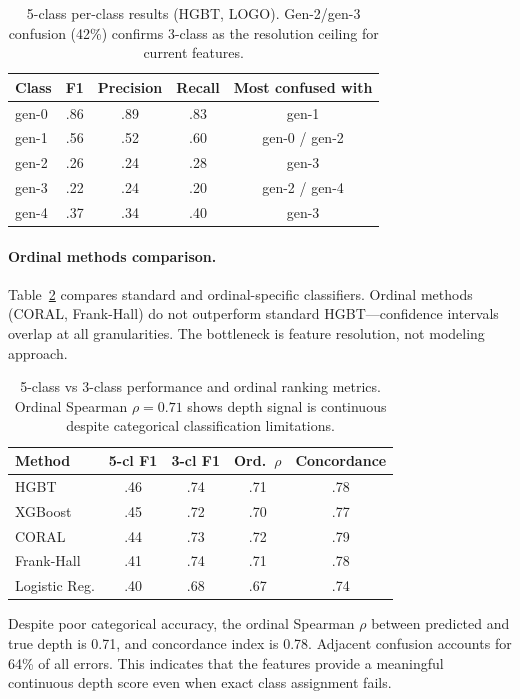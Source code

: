 \documentclass[11pt,a4paper]{article}
\begin{document}
\begin{table}[t]
\centering
\small
\begin{tabular}{lcccc}
\toprule
Class & F1 & Precision & Recall & Most confused with \\
\midrule
gen-0 & .86 & .89 & .83 & gen-1 \\
gen-1 & .56 & .52 & .60 & gen-0 / gen-2 \\
gen-2 & .26 & .24 & .28 & gen-3 \\
gen-3 & .22 & .24 & .20 & gen-2 / gen-4 \\
gen-4 & .37 & .34 & .40 & gen-3 \\
\bottomrule
\end{tabular}
\caption{5-class per-class results (HGBT, LOGO). Gen-2/gen-3 confusion (42\%) confirms 3-class as the resolution ceiling for current features.}
\label{tab:5class}
\end{table}

\paragraph{Ordinal methods comparison.} Table~\ref{tab:ordinal_methods} compares standard and ordinal-specific classifiers. Ordinal methods (CORAL, Frank-Hall) do not outperform standard HGBT---confidence intervals overlap at all granularities. The bottleneck is feature resolution, not modeling approach.

\begin{table}[t]
\centering
\small
\begin{tabular}{lcccc}
\toprule
Method & 5-cl F1 & 3-cl F1 & Ord.\ $\rho$ & Concordance \\
\midrule
HGBT & .46 & .74 & .71 & .78 \\
XGBoost & .45 & .72 & .70 & .77 \\
CORAL & .44 & .73 & .72 & .79 \\
Frank-Hall & .41 & .74 & .71 & .78 \\
Logistic Reg. & .40 & .68 & .67 & .74 \\
\bottomrule
\end{tabular}
\caption{5-class vs 3-class performance and ordinal ranking metrics. Ordinal Spearman $\rho{=}0.71$ shows depth signal is continuous despite categorical classification limitations.}
\label{tab:ordinal_methods}
\end{table}

Despite poor categorical accuracy, the ordinal Spearman $\rho$ between predicted and true depth is 0.71, and concordance index is 0.78. Adjacent confusion accounts for 64\% of all errors. This indicates that the features provide a meaningful continuous depth score even when exact class assignment fails.
\end{document}
